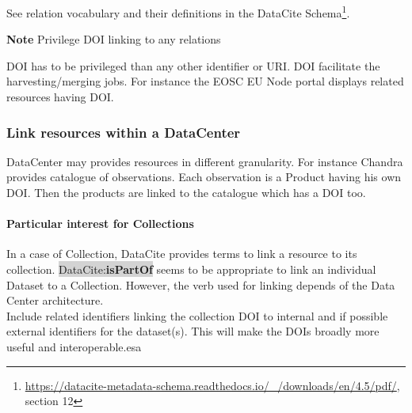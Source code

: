 \documentclass[11pt,a4paper]{ivoa}
\newcommand{\dataciteterm}[1]{\colorbox{lightgray}{DataCite:\textbf{#1}}}
\newcommand{\important}[1]{
	\begin{bigdescription}
		\item \color{ivoacolor}\textbf{Note} #1
	\end{bigdescription}
}
\begin{document}
See relation vocabulary and their definitions in the DataCite Schema\footnote{\url{https://datacite-metadata-schema.readthedocs.io/_/downloads/en/4.5/pdf/}, section 12}.


\important{Privilege DOI linking to any relations}

DOI has to be privileged than any other identifier or URI. DOI facilitate the harvesting/merging jobs. For instance the EOSC EU Node portal displays related resources having DOI.



\subsubsection{Link resources within a DataCenter}
DataCenter may provides resources in different granularity. For instance Chandra provides catalogue of observations. Each observation is a Product having his own DOI.
Then the products are linked to the catalogue which has a DOI too.

\paragraph{Particular interest for Collections}
In a case of Collection, DataCite provides terms to link a resource  to its collection. 
\dataciteterm{isPartOf}  seems to be appropriate to link an individual Dataset to a Collection. However, the verb used for linking depends of the Data Center architecture. \\



Include related identifiers linking the collection DOI to internal and if possible external identifiers for the dataset(s). 
This will make the DOIs broadly more useful and interoperable.esa
\end{document}
